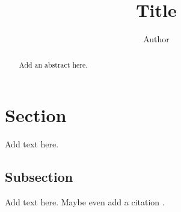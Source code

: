 \documentclass[12pt]{article}
\title{\textbf{Title}}
\author[1]{Author}
\affil[1]{\textit{Institution}}
\date{}
\begin{document}
\maketitle


\begin{abstract}

Add an abstract here.

\end{abstract}


\section{Section}
Add text here.

\subsection{Subsection}
Add text here. Maybe even add a citation \cite{key}.




\end{document}
